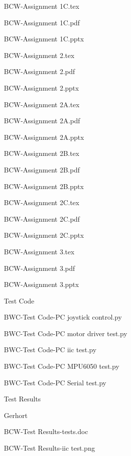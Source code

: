 \documentclass[conference]{IEEEtran}
\begin{document}
    \indent\indent\indent BCW-Assignment 1C.tex 
    
    \indent\indent\indent BCW-Assignment 1C.pdf 
    
    \indent\indent\indent BCW-Assignment 1C.pptx 
    
    \indent\indent\indent BCW-Assignment 2.tex 
    
    \indent\indent\indent BCW-Assignment 2.pdf 
    
    \indent\indent\indent BCW-Assignment 2.pptx 
    
    \indent\indent\indent BCW-Assignment 2A.tex 
    
    \indent\indent\indent BCW-Assignment 2A.pdf 
    
    \indent\indent\indent BCW-Assignment 2A.pptx 
    
    \indent\indent\indent BCW-Assignment 2B.tex 
    
    \indent\indent\indent BCW-Assignment 2B.pdf 
    
    \indent\indent\indent BCW-Assignment 2B.pptx 
    
    \indent\indent\indent BCW-Assignment 2C.tex 
    
    \indent\indent\indent BCW-Assignment 2C.pdf 
    
    \indent\indent\indent BCW-Assignment 2C.pptx 

    \indent\indent\indent BCW-Assignment 3.tex 
    
    \indent\indent\indent BCW-Assignment 3.pdf 
    
    \indent\indent\indent BCW-Assignment 3.pptx 
    
   \indent\indent Test Code 

       \indent\indent\indent BWC-Test Code-PC joystick control.py 
        
       \indent\indent\indent BWC-Test Code-PC motor driver test.py 
        
       \indent\indent\indent BWC-Test Code-PC iic test.py 
        
       \indent\indent\indent BWC-Test Code-PC MPU6050 test.py 
        
       \indent\indent\indent BWC-Test Code-PC Serial test.py 

    \indent\indent Test Results 

        \indent\indent\indent Gerhort 
        
          \indent\indent\indent\indent  BCW-Test Results-tests.doc 
            
          \indent\indent\indent\indent  BCW-Test Results-iic test.png 
            
\end{document}
